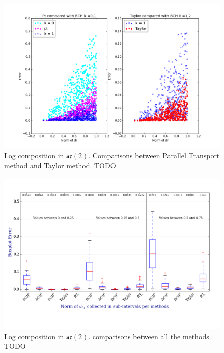 \begin{figure}[!ht]
	\hspace{-2cm}
	\includegraphics[scale=0.6]{figures/se2_pt_taylor.png}
	\caption{Log composition in $\mathfrak{se}(2)$. Comparisons between Parallel Transport method and Taylor method. TODO}
	\label{fig:se2_pt_taylor}
\end{figure}


\begin{figure}[!ht]
	\hspace{-2cm}
	\includegraphics[scale=0.75]{figures/se2_boxplot.png}
	\caption{Log composition in $\mathfrak{se}(2)$. comparisons between all the methods. TODO}
	\label{fig:se2_boxplot}
\end{figure}


